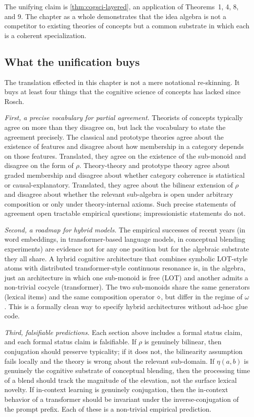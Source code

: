 \formalstatus The unifying claim is \cref{thm:cogsci-layered}, an
application of Theorems~1, 4, 8, and 9. The chapter as a whole
demonstrates that the idea algebra is not a competitor to existing theories
of concepts but a common substrate in which each is a coherent
specialization.

\subsection*{What the unification buys}

The translation effected in this chapter is not a mere notational
re-skinning. It buys at least four things that the cognitive science of
concepts has lacked since Rosch.

\emph{First, a precise vocabulary for partial agreement.} Theorists of
concepts typically agree on more than they disagree on, but lack the
vocabulary to state the agreement precisely. The classical and prototype
theories agree about the existence of features and disagree about how
membership in a category depends on those features. Translated, they
agree on the existence of the sub-monoid and disagree on the form of
$\rho$. Theory-theory and prototype theory agree about graded
membership and disagree about whether category coherence is statistical
or causal-explanatory. Translated, they agree about the bilinear
extension of $\rho$ and disagree about whether the relevant sub-algebra
is open under arbitrary composition or only under
theory-internal axioms. Such precise statements of agreement open
tractable empirical questions; impressionistic statements do not.

\emph{Second, a roadmap for hybrid models.} The empirical successes of
recent years (in word embeddings, in transformer-based language models,
in conceptual blending experiments) are evidence not for any one
position but for the algebraic substrate they all share. A hybrid
cognitive architecture that combines symbolic LOT-style atoms with
distributed transformer-style continuous resonance is, in the algebra,
just an architecture in which one sub-monoid is free (LOT) and another
admits a non-trivial cocycle (transformer). The two sub-monoids share
the same generators (lexical items) and the same composition operator
$\mathbin{\diamond}$, but differ in the regime of $\omega$. This is a
formally clean way to specify hybrid architectures without ad-hoc
glue code.

\emph{Third, falsifiable predictions.} Each section above includes a
formal status claim, and each formal status claim is falsifiable. If
$\rho$ is genuinely bilinear, then conjugation should preserve
typicality; if it does not, the bilinearity assumption fails locally
and the theory is wrong about the relevant sub-domain. If $\eta(a,b)$
is genuinely the cognitive substrate of conceptual blending, then the
processing time of a blend should track the magnitude of the
elevation, not the surface lexical novelty. If in-context learning is
genuinely conjugation, then the in-context behavior of a transformer
should be invariant under the inverse-conjugation of the prompt
prefix. Each of these is a non-trivial empirical prediction.

